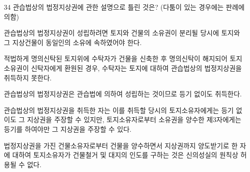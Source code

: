 \begin{question}{34}
관습법상의 법정지상권에 관한 설명으로 틀린 것은? (다툼이 있는 경우에는 판례에 의함)
\begin{choices}
  \item 관습법상의 법정지상권이 성립하려면 토지와 건물의 소유권이 분리될 당시에 토지와 그 지상건물이 동일인의 소유에 속하였어야 한다.
  \item 적법하게 명의신탁된 토지위에 수탁자가 건물을 신축한 후 명의신탁이 해지되어 토지소유권이 신탁자에게 환원된 경우, 수탁자는 토지에 대하여 관습법상의 법정지상권을 취득하지 못한다.
  \item 관습법상의 법정지상권은 관습법에 의하여 성립하는 것이므로 등기 없이도 취득한다.
  \item 관습법상의 법정지상권을 취득한 자는 이를 취득할 당시의 토지소유자에게는 등기 없이도 그 지상권을 주장할 수 있지만, 토지소유자로부터 소유권을 양수한 제3자에게는 등기를 하여야만 그 지상권을 주장할 수 있다.
  \item 법정지상권을 가진 건물소유자로부터 건물을 양수하면서 지상권까지 양도받기로 한 자에 대하여 토지소유자가 건물철거 및 대지의 인도를 구하는 것은 신의성실의 원칙상 허용될 수 없다.
\end{choices}
\end{question}
